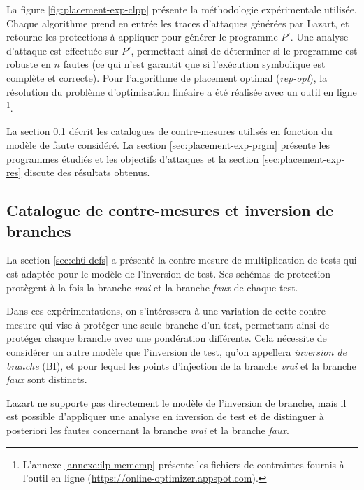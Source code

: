         La figure \ref{fig:placement-exp-clpp} présente la méthodologie expérimentale utilisée. Chaque algorithme prend en entrée les traces d'attaques générées par Lazart, et retourne les protections à appliquer pour générer le programme $P'$. 
        Une analyse d'attaque est effectuée sur $P'$, permettant ainsi de déterminer si le programme est robuste en $n$ fautes (ce qui n'est garantit que si l'exécution symbolique est complète et correcte).
        Pour l'algorithme de placement optimal (\textit{rep-opt}), la résolution du problème d'optimisation linéaire a été réalisée avec un outil en ligne \footnote{L'annexe \ref{annexe:ilp-memcmp} présente les fichiers de contraintes fournis à l'outil en ligne (\url{https://online-optimizer.appspot.com}).}.
        
        La section \ref{sec:placement-exp-cms} décrit les catalogues de contre-mesures utilisés en fonction du modèle de faute considéré.
        La section \ref{sec:placement-exp-prgm} présente les programmes étudiés et les objectifs d'attaques et la section \ref{sec:placement-exp-res} discute des résultats obtenus.

        \subsection{Catalogue de contre-mesures et inversion de branches}
        \label{sec:placement-exp-cms}

            La section \ref{sec:ch6-defs} a présenté la contre-mesure de multiplication de tests qui est adaptée pour le modèle de l'inversion de test.
            Ses schémas de protection protègent à la fois la branche \textit{vrai} et la branche \textit{faux} de chaque test.

            Dans ces expérimentations, on s'intéressera à une variation de cette contre-mesure qui vise à protéger une seule branche d'un test, permettant ainsi de protéger chaque branche avec une pondération différente.
            Cela nécessite de considérer un autre modèle que l'inversion de test, qu'on appellera \textit{inversion de branche} (\gls{BI}), et pour lequel les points d'injection de la branche \textit{vrai} et la branche \textit{faux} sont distincts.

            Lazart ne supporte pas directement le modèle de l'inversion de branche, mais il est possible d'appliquer une analyse en inversion de test et de distinguer à posteriori les fautes concernant la branche \textit{vrai} et la branche \textit{faux}.

